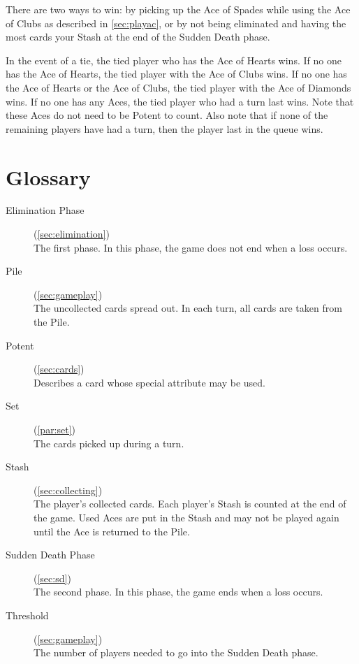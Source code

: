 \documentclass{article}
\begin{document}
There are two ways to win: by picking up the Ace of Spades while using
the Ace of Clubs as described in \autoref{sec:playac}, or by not being
eliminated and having the most cards your Stash at the end of the Sudden
Death phase.

In the event of a tie, the tied player who has the Ace of Hearts wins.
If no one has the Ace of Hearts, the tied player with the Ace of Clubs
wins. If no one has the Ace of Hearts or the Ace of Clubs, the tied
player with the Ace of Diamonds wins. If no one has any Aces, the tied
player who had a turn last wins. Note that these Aces do not need to be
Potent to count. Also note that if none of the remaining players have
had a turn, then the player last in the queue wins.

\newpage
\section{Glossary}
\begin{description}
  \item[Elimination Phase](\autoref{sec:elimination})\\
    The first phase. In this phase, the game does not end when a loss
    occurs.
  \item[Pile](\autoref{sec:gameplay})\\
    The uncollected cards spread out. In each turn, all cards are taken
    from the Pile.
  \item[Potent](\autoref{sec:cards})\\
    Describes a card whose special attribute may be used.
  \item[Set](\autoref{par:set})\\
    The cards picked up during a turn.
  \item[Stash](\autoref{sec:collecting})\\
    The player's collected cards. Each player's Stash is
    counted at the end of the game. Used Aces are put in the Stash and
    may not be played again until the Ace is returned to the Pile.
  \item[Sudden Death Phase](\autoref{sec:sd})\\
    The second phase. In this phase, the game ends when a loss occurs.
  \item[Threshold](\autoref{sec:gameplay})\\
    The number of players needed to go into the Sudden
    Death phase.
\end{description}
\end{document}

